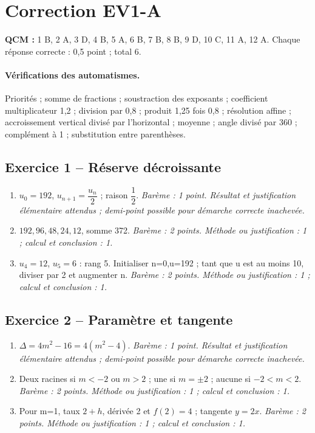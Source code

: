 \mxnewpage\section*{Correction EV1-A}\label{EV1-A-CORR}
\textbf{QCM :} 1 B, 2 A, 3 D, 4 B, 5 A, 6 B, 7 B, 8 B, 9 D, 10 C, 11 A, 12 A. Chaque réponse correcte : 0{,}5 point ; total 6.
\paragraph{Vérifications des automatismes.} Priorités ; somme de fractions ; soustraction des exposants ; coefficient multiplicateur 1{,}2 ; division par 0{,}8 ; produit 1{,}25 fois 0{,}8 ; résolution affine ; accroissement vertical divisé par l’horizontal ; moyenne ; angle divisé par 360 ; complément à 1 ; substitution entre parenthèses.
\subsection*{Exercice 1 -- Réserve décroissante}
\begin{enumerate}
\item $u_0=192$, $u_{n+1}=\dfrac{u_n}{2}$ ; raison $\dfrac{1}{2}$. \textit{Barème : 1 point. Résultat et justification élémentaire attendus ; demi-point possible pour démarche correcte inachevée.}
\item $192,96,48,24,12$, somme 372. \textit{Barème : 2 points. Méthode ou justification : 1 ; calcul et conclusion : 1.}
\item $u_4=12$, $u_5=6$ : rang 5. Initialiser n=0,u=192 ; tant que u est au moins 10, diviser par 2 et augmenter n. \textit{Barème : 2 points. Méthode ou justification : 1 ; calcul et conclusion : 1.}
\end{enumerate}
\subsection*{Exercice 2 -- Paramètre et tangente}
\begin{enumerate}
\item $\Delta=4m^2-16=4(m^2-4)$. \textit{Barème : 1 point. Résultat et justification élémentaire attendus ; demi-point possible pour démarche correcte inachevée.}
\item Deux racines si $m<-2$ ou $m>2$ ; une si $m=\pm2$ ; aucune si $-2<m<2$. \textit{Barème : 2 points. Méthode ou justification : 1 ; calcul et conclusion : 1.}
\item Pour m=1, taux $2+h$, dérivée 2 et $f(2)=4$ ; tangente $y=2x$. \textit{Barème : 2 points. Méthode ou justification : 1 ; calcul et conclusion : 1.}
\end{enumerate}
